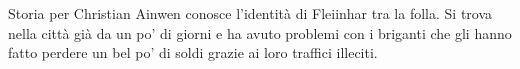 \begin{commentbox}{Storia per Christian}
  Ainwen conosce l'identit\`a di Fleiinhar tra la folla. Si trova nella citt\`a
  gi\`a da un po' di giorni e ha avuto problemi con i briganti che gli hanno fatto
  perdere un bel po' di soldi grazie ai loro traffici illeciti.
\end{commentbox}
